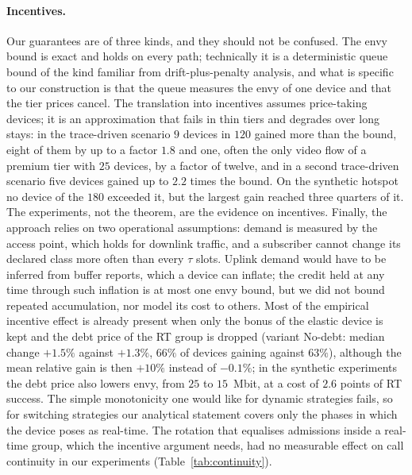 \documentclass[preprint,11pt]{elsarticle}
\theoremstyle{definition}
\theoremstyle{remark}
\begin{document}
\paragraph{Incentives.}
Our guarantees are of three kinds, and they should not be confused.
The envy bound is exact and holds on every path; technically it is a deterministic queue bound of the kind familiar from drift-plus-penalty analysis, and what is specific to our construction is that the queue measures the envy of one device and that the tier prices cancel.
The translation into incentives assumes price-taking devices; it is an approximation that fails in thin tiers and degrades over long stays: in the trace-driven scenario $9$ devices in $120$ gained more than the bound, eight of them by up to a factor $1.8$ and one, often the only video flow of a premium tier with $25$ devices, by a factor of twelve, and in a second trace-driven scenario five devices gained up to $2.2$ times the bound. On the synthetic hotspot no device of the $180$ exceeded it, but the largest gain reached three quarters of it. The experiments, not the theorem, are the evidence on incentives.
Finally, the approach relies on two operational assumptions: demand is measured by the access point, which holds for downlink traffic, and a subscriber cannot change its declared class more often than every $\tau$ slots.
Uplink demand would have to be inferred from buffer reports, which a device can inflate; the credit held at any time through such inflation is at most one envy bound, but we did not bound repeated accumulation, nor model its cost to others.
Most of the empirical incentive effect is already present when only the bonus of the elastic device is kept and the debt price of the RT group is dropped (variant No-debt: median change $+1.5\%$ against $+1.3\%$, $66\%$ of devices gaining against $63\%$), although the mean relative gain is then $+10\%$ instead of $-0.1\%$; in the synthetic experiments the debt price also lowers envy, from $25$ to $15$~Mbit, at a cost of $2.6$ points of RT success.
The simple monotonicity one would like for dynamic strategies fails, so for switching strategies our analytical statement covers only the phases in which the device poses as real-time.
The rotation that equalises admissions inside a real-time group, which the incentive argument needs, had no measurable effect on call continuity in our experiments (Table~\ref{tab:continuity}).
\end{document}
